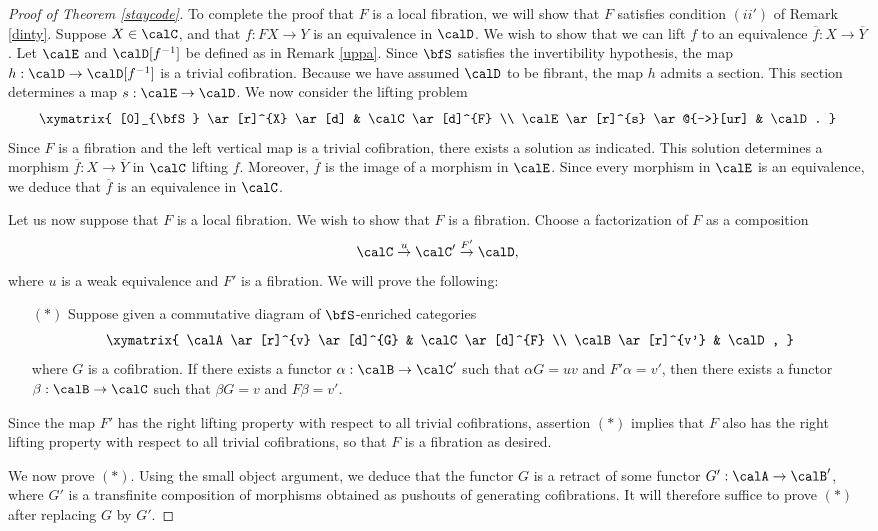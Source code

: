 \begin{Simplicial Categories}
\begin{proof}[Proof of Theorem \ref{staycode}]
To complete the proof that $F$ is a local fibration, we will show that $F$ satisfies condition $(ii')$ of Remark \ref{dinty}. Suppose $X \in \calC$, and that $f: FX \rightarrow Y$ is an equivalence in
$\calD$. We wish to show that we can lift $f$ to an equivalence
$\overline{f}: X \rightarrow \overline{Y}$. Let $\calE$ and $\calD[f^{-1}]$ be defined as
in Remark \ref{uppa}. 
Since $\bfS$ satisfies the invertibility hypothesis, the map $h: \calD \rightarrow \calD[f^{-1}]$
is a trivial cofibration. Because we have assumed $\calD$ to be fibrant, the map $h$
admits a section. This section determines a map $s: \calE \rightarrow \calD$.
We now consider the lifting problem
$$ \xymatrix{ [0]_{\bfS} \ar[r]^{X} \ar[d] & \calC \ar[d]^{F} \\
\calE \ar[r]^{s} \ar@{-->}[ur] & \calD. }$$
Since $F$ is a fibration and the left vertical map is a trivial cofibration, there
exists a solution as indicated. This solution determines a morphism
$\overline{f}: X \rightarrow \overline{Y}$ in $\calC$ lifting $f$.
Moreover, $\overline{f}$ is the image of a morphism in $\calE$.
Since every morphism in $\calE$ is an equivalence, we deduce that
$\overline{f}$ is an equivalence in $\calC$.

Let us now suppose that $F$ is a local fibration. We wish to show that
$F$ is a fibration. Choose a factorization of $F$ as a composition
$$ \calC \stackrel{u}{\rightarrow} \calC' \stackrel{F'}{\rightarrow} \calD,$$
where $u$ is a weak equivalence and $F'$ is a fibration. We will prove the following:

\begin{itemize}
\item[$(\ast)$] Suppose given a commutative diagram of $\bfS$-enriched categories
$$ \xymatrix{ \calA \ar[r]^{v} \ar[d]^{G} & \calC \ar[d]^{F} \\
\calB \ar[r]^{v'} & \calD, }$$
where $G$ is a cofibration. If there exists a functor $\alpha: \calB \rightarrow \calC'$ such
that $\alpha G = u v$ and $F' \alpha = v'$, then there exists a functor $\beta: \calB \rightarrow \calC$
such that $\beta G = v$ and $F \beta = v'$. 
\end{itemize}

Since the map $F'$ has the right lifting property with respect to all trivial cofibrations, 
assertion $(\ast)$ implies that $F$ also has the right lifting property with respect to all trivial cofibrations, so that $F$ is a fibration as desired.

We now prove $(\ast)$. Using the small object argument, we deduce that 
the functor $G$ is a retract of some functor $G': \calA \rightarrow \calB'$, where
$G'$ is a transfinite composition of morphisms obtained as pushouts of 
generating cofibrations. It will therefore suffice to prove $(\ast)$ after replacing $G$ by $G'$.


\end{proof}
\end{Simplicial Categories}
